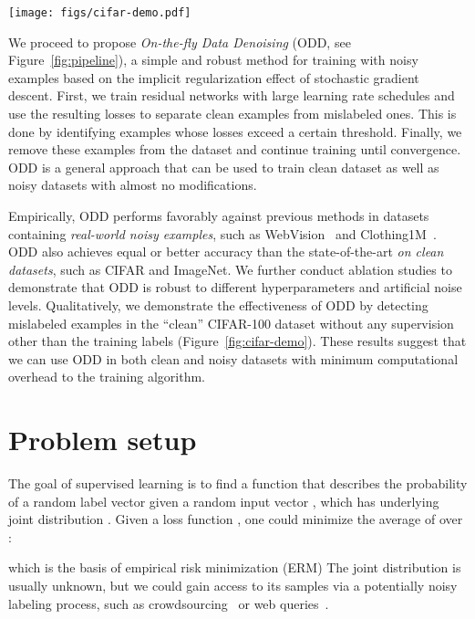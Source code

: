 \documentclass[a4paper,11pt]{article}
\begin{document}
\begin{figure*}[t]
    \centering
    \texttt{[image: figs/cifar-demo.pdf]}
    \caption{Mislabeled examples in the CIFAR-100 training set detected by \textsc{ODD}.}
    \label{fig:cifar-demo}
\end{figure*}

We proceed to propose \textit{On-the-fly Data Denoising} (\textsc{ODD}, see Figure~\ref{fig:pipeline}), a simple and robust method for training with noisy examples based on the implicit regularization effect of stochastic gradient descent.
First, we train residual networks with large learning rate schedules and use the resulting losses to separate clean examples from mislabeled ones. 
This is done by identifying examples whose losses exceed a certain threshold. 
Finally, we remove these examples from the dataset and continue training until convergence. \textsc{ODD} is a general approach that can be used to train clean dataset as well as noisy datasets with almost no modifications.




Empirically, \textsc{ODD} performs favorably against previous methods in datasets containing \textit{real-world noisy examples}, such as WebVision~\cite{li2017webvision} and Clothing1M~\cite{xiao2015learning}. \textsc{ODD} also achieves equal or better accuracy than the state-of-the-art \textit{on clean datasets}, such as CIFAR and ImageNet. 
We further conduct ablation studies to demonstrate that \textsc{ODD} is robust to different hyperparameters and artificial noise levels. Qualitatively, we demonstrate the effectiveness of \textsc{ODD} by detecting mislabeled examples in the ``clean'' CIFAR-100 dataset without any supervision other than the training labels (Figure~\ref{fig:cifar-demo}). These results suggest that we can use \textsc{ODD} in both clean and noisy datasets with minimum computational overhead to the training algorithm. 



 \section{Problem setup}

The goal of supervised learning is to find a function  that describes the probability of a random label vector  given a random input vector , which has underlying joint distribution . Given a loss function , one could minimize the average of  over :

which is the basis of empirical risk minimization (\textsc{ERM})
The joint distribution  is usually unknown, but we could gain access to its samples via a potentially noisy labeling process, such as crowdsourcing~\cite{krishna2016embracing} or web queries~\cite{li2017webvision}. 
\end{document}
